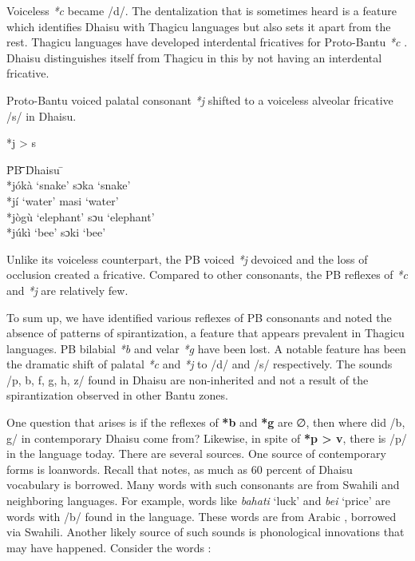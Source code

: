 \documentclass[output=paper,colorlinks,citecolor=brown]{langscibook}
\begin{document}
Voiceless \textit{*c} became /d/. The dentalization that is sometimes heard is a feature which identifies Dhaisu with Thagicu languages but also sets it apart from the rest. Thagicu languages have developed interdental fricatives for Proto-Bantu \textit{*c }\citep{Nurse1982}. Dhaisu distinguishes itself from Thagicu in this by not having an interdental fricative. 

Proto-Bantu voiced palatal consonant \textit{*j}  shifted to a voiceless alveolar fricative /s/ in Dhaisu.

\ea%
    \label{ex:ngonyani:10}
    *j > s\\
	\begin{tabbing} 
        \= PB \quad\= \quad\= \quad\= \quad\= \quad\= \quad\= \quad\= Dhaisu \quad\=  \quad\= \\
        \>  *jókà
        \> ‘snake’
        \> \> \>  \> \> \> sɔka
        \> ‘snake’\\
        
        \> *jí
        \> ‘water’
        \> \> \>  \> \> \> masi
        \> ‘water’\\
        
        \> *jògù
        \> ‘elephant’
        \> \> \>  \> \> \> sɔu
        \> ‘elephant’\\
        
        \> *júkì
        \> ‘bee’
        \> \> \>  \> \> \> sɔki
        \> ‘bee’
    \end{tabbing}
\z

Unlike its voiceless counterpart, the PB voiced \textit{*j} devoiced and the loss of occlusion  created a fricative. Compared to other consonants, the PB reflexes of \textit{*c} and \textit{*j} are relatively few.

To sum up, we have identified various reflexes of PB consonants and noted the absence of patterns of spirantization, a feature that appears prevalent in Thagicu languages. PB bilabial \textit{*b} and velar \textit{*g}  have been lost. A notable feature has been the dramatic shift of palatal \textit{*c }and \textit{*j} to /d/ and /s/ respectively. The sounds /p, b, f, g, h, z/ found in Dhaisu are non-inherited \citep{Nurse2000}  and not a result of the spirantization observed in other Bantu zones. 
     
One question that arises is if the reflexes of \textbf{*b} and \textbf{*g} are ∅, then where did /b, g/ in contemporary Dhaisu come from? Likewise, in spite of \textbf{*p > v}, there is /p/ in the language today. There are several sources. One source of contemporary forms is loanwords. Recall that \citet[20]{Nurse2000} notes, as much as 60 percent of Dhaisu vocabulary is borrowed. Many words with such consonants are from Swahili and neighboring languages. For example, words like \textit{bahati }‘luck’ and \textit{bei} ‘price’ are words with /b/ found in the language. These words are from Arabic \citep{TUKI1996}, borrowed via Swahili. Another likely source of such sounds is phonological innovations that may have happened. Consider the words :
\end{document}

